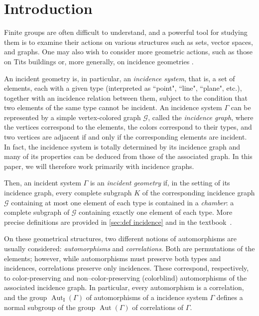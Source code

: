 \documentclass{amsart}
\theoremstyle{definition}
\theoremstyle{remark}
\newcommand{\Aut}{\operatorname{Aut}}
\newcommand{\AutI}{\Aut_{\text{I}}}
\newcommand{\G}{\mathcal{G}}
\begin{document}
\maketitle

\section{Introduction}

Finite groups are often difficult to understand, and a powerful tool for studying them is to examine their actions on various structures such as sets, vector spaces, and graphs. One may also wish to consider more geometric actions, such as those on Tits buildings \cite{Tits} or, more generally, on incidence geometries \cite{Bue1,Bue2}. 

An incident geometry is, in particular, an \emph{incidence system}, that is, a set of elements, each with a given type (interpreted as ``point", ``line", ``plane", etc.), together with an incidence relation between them, subject to the condition that two elements of the same type cannot be incident. An incidence system $\Gamma$ can be represented by a simple vertex-colored graph $\G$, called the \emph{incidence graph}, where the vertices correspond to the elements, the colors correspond to their types, and two vertices are adjacent if and only if the corresponding elements are incident. In fact, the incidence system is totally determined by its incidence graph and many of its properties can be deduced from those of the associated graph. In this paper, we will therefore work primarily with incidence graphs.

Then, an incident system $\Gamma$ is an \emph{incident geometry} if, in the setting of its incidence graph, every complete subgraph $K$ of the corresponding incidence graph $\G$ containing at most one element of each type is contained in a \emph{chamber}: a complete subgraph of $\G$ containing exactly one element of each type. More precise definitions are provided in \autoref{sec:def incidence} and in the textbook~\cite{Bue2}. 

On these geometrical structures, two different notions of automorphisms are usually considered: \emph{automorphisms} and \emph{correlations}. Both are permutations of the elements; however, while automorphisms must preserve both types and incidences, correlations preserve only incidences. These correspond, respectively, to color-preserving and non–color-preserving (colorblind) automorphisms of the associated incidence graph. In particular, every automorphism is a correlation, and the group $\AutI(\Gamma)$ of automorphisms of a incidence system $\Gamma$ defines a normal subgroup of the group $\Aut(\Gamma)$ of correlations of $\Gamma$. 
\end{document}
